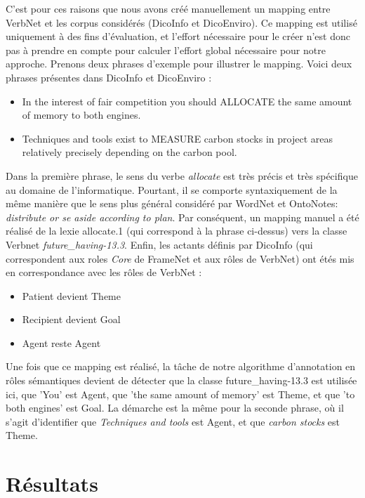C'est pour ces raisons que nous avons créé manuellement un mapping entre
VerbNet et les corpus considérés (DicoInfo et DicoEnviro). Ce mapping est
utilisé uniquement à des fins d'évaluation, et l'effort nécessaire pour le
créer n'est donc pas à prendre en compte pour calculer l'effort global
nécessaire pour notre approche. Prenons deux phrases d'exemple pour illustrer
le mapping. Voici deux phrases présentes dans DicoInfo et DicoEnviro :

\begin{itemize}
    \item In the interest of fair competition you should ALLOCATE the same amount of memory to both engines.
    \item Techniques and tools exist to MEASURE carbon stocks in project areas relatively precisely depending on the carbon pool.
\end{itemize}

Dans la première phrase, le sens du verbe \textit{allocate} est très précis et
très spécifique au domaine de l'informatique. Pourtant, il se comporte
syntaxiquement de la même manière que le sens plus général considéré par
WordNet et OntoNotes: \textit{distribute or se aside according to plan}. Par
conséquent, un mapping manuel a été réalisé de la lexie allocate.1 (qui
correspond à la phrase ci-dessus) vers la classe Verbnet
\textit{future\_having-13.3}. Enfin, les actants définis par DicoInfo (qui
correspondent aux roles \textit{Core} de FrameNet et aux rôles de VerbNet) ont
étés mis en correspondance avec les rôles de VerbNet :

\begin{itemize}
    \item Patient devient Theme
    \item Recipient devient Goal
    \item Agent reste Agent
\end{itemize}

Une fois que ce mapping est réalisé, la tâche de notre algorithme d'annotation
en rôles sémantiques devient de détecter que la classe future\_having-13.3 est
utilisée ici, que 'You' est Agent, que 'the same amount of memory' est Theme,
et que 'to both engines' est Goal. La démarche est la même pour la seconde
phrase, où il s'agit d'identifier que \textit{Techniques and tools} est Agent,
et que \textit{carbon stocks} est Theme.

\section{Résultats}


